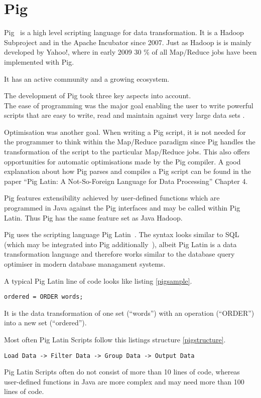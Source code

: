 \section{Pig}

Pig~\cite{pigWebsite}  is a high level scripting language for data transformation. It is a Hadoop Subproject and in the Apache Incubator since 2007. Just as Hadoop is is mainly developed by Yahoo!, where in early 2009 30 \% of all Map/Reduce jobs have been implemented with Pig.~\cite{pig30percent}

It has an active community and a growing ecosystem.

The development of Pig took three key aspects into account. \\
The ease of programming was the major goal enabling the user to write powerful scripts that are easy to write, read and maintain against very large data sets .~\cite{pigWebsite}

Optimisation was another goal. When writing a Pig script, it is not needed for the programmer to think within the Map/Reduce paradigm since Pig handles the transformation of the script to the particular Map/Reduce jobs. This also offers opportunities for automatic optimisations made by the Pig compiler. A good explanation about how Pig parses and compiles a Pig script can be found in the paper ``Pig Latin: A Not-So-Foreign Language for Data Processing'' Chapter 4.~\cite{pigNotForeign}

Pig features extensibility achieved by user-defined functions which are programmed in Java against the Pig interfaces and may be called within Pig Latin. Thus Pig has the same feature set as Java Hadoop.

Pig uses the scripting language Pig Latin~\cite{pigManual}. The syntax looks similar to SQL (which may be integrated into Pig additionally~\cite{pigSql}), albeit Pig Latin is a data transformation language and therefore works similar to the database query optimiser in modern database managament systems.

A typical Pig Latin line of code looks like listing \ref{pigsample}.

\begin{lstlisting}[language=pig,caption=A typical Pig line of code,label=pigsample]
ordered = ORDER words;
\end{lstlisting}

It is the data transformation of one set (``words'') with an operation (``ORDER'') into a new set (``ordered'').

Most often Pig Latin Scripts follow this listings structure \ref{pigstructure}.

\begin{lstlisting}[language=pig,caption=Pig Latin Script Structure ,label=pigstructure]
Load Data -> Filter Data -> Group Data -> Output Data
\end{lstlisting}
                                                     
Pig Latin Scripts often do not consist of more than 10 lines of code, whereas user-defined functions in Java are more complex and may need more than 100 lines of code.
                                                                                                               